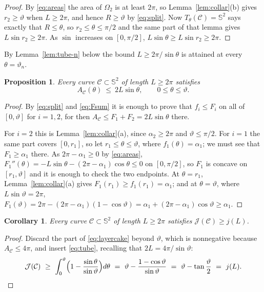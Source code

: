 \documentclass[11pt,oneside,reqno]{amsart}
\theoremstyle{plain}
\newtheorem{proposition}[theorem]{Proposition}
\newtheorem{corollary}[theorem]{Corollary}
\theoremstyle{definition}
\newcommand{\Sph}{\mathbb{S}^{2}}
\begin{document}
\begin{proof}
By \eqref{eq:areas} the area of $\Omega_{2}$ is at least $2\pi$, so
Lemma~\ref{lem:collar}(b) gives $r_{2}\ge\vartheta$ when $L\ge2\pi$, and hence
$R\ge\vartheta$ by \eqref{eq:split}. Now $T_{\theta}(\mathcal{C})=\Sph$ says
exactly that $R\le\theta$, so $r_{2}\le\theta\le\pi/2$ and the same part of that
lemma gives $L\sin r_{2}\ge2\pi$. As $\sin$ increases on $[0,\pi/2]$,
$L\sin\theta\ge L\sin r_{2}\ge2\pi$.
\end{proof}

By Lemma~\ref{lem:tube-n} below the bound $L\ge2\pi/\sin\theta$ is attained at
every $\theta=\vartheta_{n}$.

\begin{proposition}\label{prop:tube}
Every curve $\mathcal{C}\subset\Sph$ of length $L\ge2\pi$ satisfies
\begin{equation}\label{eq:tube}
  A_{\mathcal{C}}(\theta)\ \le\ 2L\sin\theta,
  \qquad 0\le\theta\le\vartheta .
\end{equation}
\end{proposition}

\begin{proof}
By \eqref{eq:split} and \eqref{eq:Fsum} it is enough to prove that
$f_{i}\le F_{i}$ on all of $[0,\vartheta]$ for $i=1,2$, for then
$A_{\mathcal{C}}\le F_{1}+F_{2}=2L\sin\theta$ there.

For $i=2$ this is Lemma~\ref{lem:collar}(a), since $\alpha_{2}\ge2\pi$ and
$\vartheta\le\pi/2$. For $i=1$ the same part covers $[0,r_{1}]$, so let
$r_{1}\le\theta\le\vartheta$, where $f_{1}(\theta)=\alpha_{1}$; we must see that
$F_{1}\ge\alpha_{1}$ there. As $2\pi-\alpha_{1}\ge0$ by \eqref{eq:areas},
$F_{1}''(\theta)=-L\sin\theta-(2\pi-\alpha_{1})\cos\theta\le0$ on $[0,\pi/2]$,
so $F_{1}$ is concave on $[r_{1},\vartheta]$ and it is enough to check the two
endpoints. At $\theta=r_{1}$, Lemma~\ref{lem:collar}(a) gives
$F_{1}(r_{1})\ge f_{1}(r_{1})=\alpha_{1}$; and at $\theta=\vartheta$, where
$L\sin\vartheta=2\pi$,
$F_{1}(\vartheta)=2\pi-(2\pi-\alpha_{1})(1-\cos\vartheta)
=\alpha_{1}+(2\pi-\alpha_{1})\cos\vartheta\ge\alpha_{1}$.
\end{proof}

\begin{corollary}\label{cor:bound}
Every curve $\mathcal{C}\subset\Sph$ of length $L\ge2\pi$ satisfies
$\mathcal{J}(\mathcal{C})\ge j(L)$.
\end{corollary}

\begin{proof}
Discard the part of \eqref{eq:layercake} beyond $\vartheta$, which is
nonnegative because $A_{\mathcal{C}}\le4\pi$, and insert \eqref{eq:tube},
recalling that $2L=4\pi/\sin\vartheta$:
\[
  \mathcal{J}(\mathcal{C})\ \ge\
  \int_{0}^{\vartheta}\Bigl(1-\frac{\sin\theta}{\sin\vartheta}\Bigr)d\theta
  \ =\ \vartheta-\frac{1-\cos\vartheta}{\sin\vartheta}
  \ =\ \vartheta-\tan\frac{\vartheta}{2}\ =\ j(L).
  \qedhere
\]
\end{proof}
\end{document}
